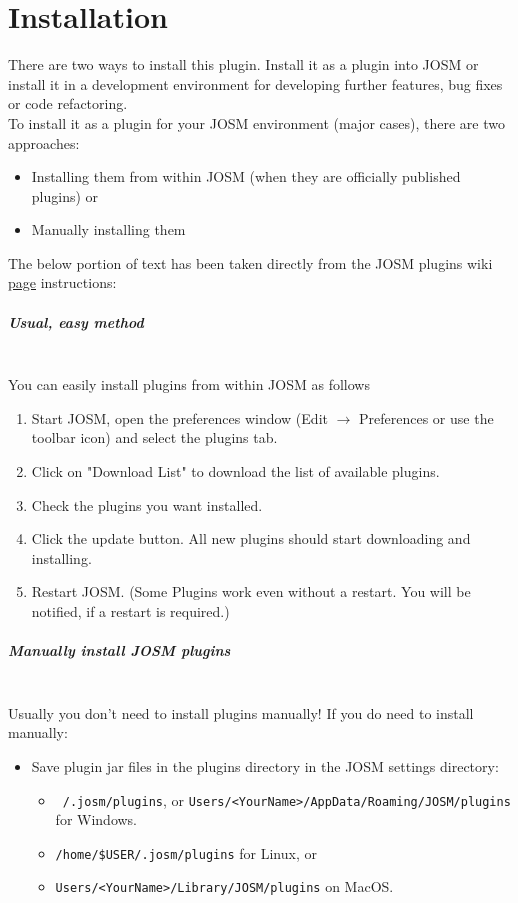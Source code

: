 \chapter{Installation}
There are two ways to install this plugin. Install it as a plugin into JOSM or install it in a development environment for developing further features, bug fixes or code refactoring.\\
\newline
To install it as a plugin for your JOSM environment (major cases), there are two approaches:
\begin{itemize}
	\item Installing them from within JOSM (when they are officially published plugins) or
	\item Manually installing them
\end{itemize}

The below portion of text has been taken directly from the JOSM plugins wiki \href{https://wiki.openstreetmap.org/wiki/JOSM/Plugins#Installation}{page} instructions: \cite{JOSMPlugins}\
\paragraph{Usual, easy method}\mbox{}\\
You can easily install plugins from within JOSM as follows
\begin{enumerate}
	\item Start JOSM, open the preferences window (Edit $\rightarrow$ Preferences or use the toolbar icon) and select the plugins tab.
	\item Click on "Download List" to download the list of available plugins.
	\item Check the plugins you want installed.
	\item Click the update button. All new plugins should start downloading and installing.
	\item Restart JOSM. (Some Plugins work even without a restart. You will be notified, if a restart is required.)
\end{enumerate}
\paragraph{Manually install JOSM plugins}\mbox{}\\
\label{par:ManuallyInstall}
Usually you don't need to install plugins manually! If you do need to install manually:

\begin{itemize}
	\item{Save plugin jar files in the plugins directory in the JOSM settings directory:
		\begin{itemize}
			\item \texttt{~/.josm/plugins}, or \texttt{Users/<YourName>/AppData/Roaming/JOSM/plugins} for Windows.
			\item \texttt{/home/\$USER/.josm/plugins} for Linux, or
			\item \texttt{Users/<YourName>/Library/JOSM/plugins} on MacOS.
		\end{itemize}  }
\end{itemize}

